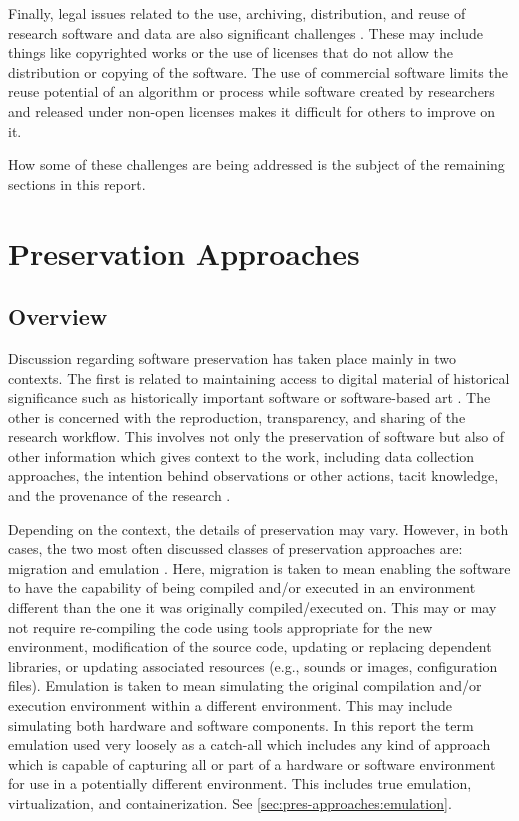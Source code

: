\documentclass[letterpaper,11pt]{article}
\begin{document}
Finally, legal issues related to the use, archiving, distribution, and reuse of research software and data are also significant challenges \citep{stodden2014,rosenthal2015,mckeehan2016}. These may include things like copyrighted works or the use of licenses that do not allow the distribution or copying of the software. The use of commercial software limits the reuse potential of an algorithm or process while software created by researchers and released under non-open licenses makes it difficult for others to improve on it.

How some of these challenges are being addressed is the subject of the remaining sections in this report.


\section{Preservation Approaches}
\label{sec:pres-approaches}

\subsection{Overview}
\label{sec:pres-approaches:overeview}
Discussion regarding software preservation has taken place mainly in two contexts. The first is related to maintaining access to digital material of historical significance such as historically important software or software-based art \citep{zabolitzky2002,newman2012,lowood2004,kaltman2014,shustek2006}. The other is concerned with the reproduction, transparency, and sharing of the research workflow. This involves not only the preservation of software but also of other information which gives context to the work, including data collection approaches, the intention behind observations or other actions, tacit knowledge, and the provenance of the research \citep{hong2010,matthews2010,stodden2014,hong2014a,thain2015,freire2012,freire2006,stodden2014a}.

Depending on the context, the details of preservation may vary. However, in both cases, the two most often discussed classes of preservation approaches are: migration and emulation \citep{rosenthal2015,rothenberg1999a}. Here, migration is taken to mean enabling the software to have the capability of being compiled and/or executed in an environment different than the one it was originally compiled/executed on. This may or may not require re-compiling the code using tools appropriate for the new environment, modification of the source code, updating or replacing dependent libraries, or updating associated resources (e.g., sounds or images, configuration files). Emulation is taken to mean simulating the original compilation and/or execution environment within a different environment. This may include simulating both hardware and software components. In this report the term emulation used very loosely as a catch-all which includes any kind of approach which is capable of capturing all or part of a hardware or software environment for use in a potentially different environment. This includes true emulation, virtualization, and containerization. See \cref{sec:pres-approaches:emulation}.
\end{document}
